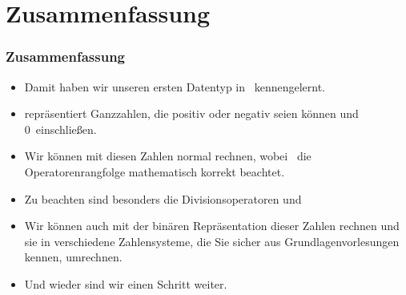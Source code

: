 \documentclass[aspectratio=169,mathserif,notheorems]{beamer}%
\begin{document}
\section{Zusammenfassung}%
%
\begin{frame}%
\frametitle{Zusammenfassung}%
\begin{itemize}%
\item Damit haben wir unseren ersten Datentyp in \python\ kennengelernt.%
\item<2->  repräsentiert Ganzzahlen, die positiv oder negativ seien können und 0~einschließen.%
\item<3-> Wir können mit diesen Zahlen normal rechnen, wobei \python\ die Operatorenrangfolge mathematisch korrekt beachtet.%
\item<4-> Zu beachten sind besonders die Divisionsoperatoren \pythonil{/} und \pythonil{//}%
\item<7-> Wir können auch mit der binären Repräsentation dieser Zahlen rechnen und sie in verschiedene Zahlensysteme, die Sie sicher aus Grundlagenvorlesungen kennen, umrechnen.%
\item<8-> Und wieder sind wir einen Schritt weiter.%
\end{itemize}%
\end{frame}%
%
\endPresentation%
\end{document}
